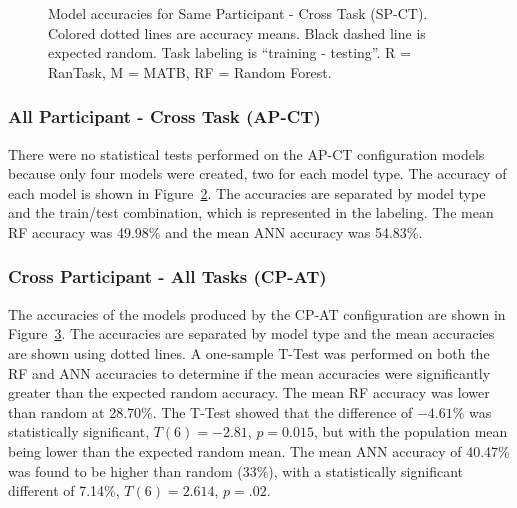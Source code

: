 \documentclass[11pt]{article}
\begin{document}
		\begin{figure}
		\centering
		\caption[Same Participant - Cross Task (SP-CT) Model Accuracies]{ Model accuracies for Same Participant - Cross Task (SP-CT). Colored dotted lines are accuracy means. Black dashed line is expected random. Task labeling is ``training - testing''. R = RanTask, M = MATB, RF = Random Forest. }
		\label{fig:sp-ct}
		\end{figure} 
		
		\subsubsection{All Participant - Cross Task (AP-CT)}
		There were no statistical tests performed on the AP-CT configuration models because only four models were created, two for each model type. The accuracy of each model is shown in Figure~\ref{fig:ap-ct}. The accuracies are separated by model type and the train/test combination, which is represented in the labeling. The mean RF accuracy was 49.98\% and the mean ANN accuracy was 54.83\%.
		
		\begin{figure}
		\centering
		\caption{}
		\label{fig:ap-ct}
		\end{figure} 
		
		\subsubsection{Cross Participant - All Tasks (CP-AT)}
		The accuracies of the models produced by the CP-AT configuration are shown in Figure~\ref{fig:cp-at}. The accuracies are separated by model type and the mean accuracies are shown using dotted lines. A one-sample T-Test was performed on both the RF and ANN accuracies to determine if the mean accuracies were significantly greater than the expected random accuracy. The mean RF accuracy was lower than random at 28.70\%. The T-Test showed that the difference of \(-4.61\%\) was statistically significant, \(T(6) = -2.81\), \(p = 0.015\), but with the population mean being lower than the expected random mean. The mean ANN accuracy of 40.47\% was found to be higher than random (33\%), with a statistically significant different of 7.14\%, \(T(6) = 2.614\), \(p = .02\).
		
		\begin{figure}
		\centering
		\caption{}
		\label{fig:cp-at}
		\end{figure} 
		
\end{document}
